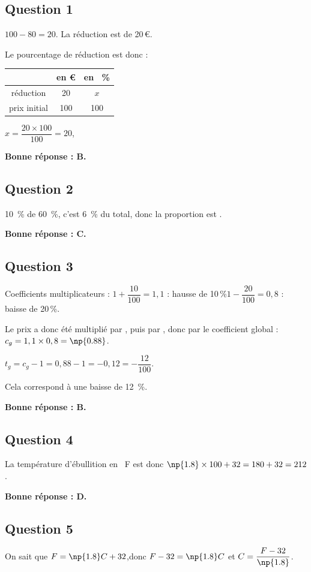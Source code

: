 \subsection*{Question 1}
	$100 - 80  =  20$.
	\quad
	La réduction est de 20\,\euro{}.

	Le pourcentage de réduction est donc :\quad
		\begin{tabular}{c|c|c}
	&en \euro  &en ~\% \\\hline
		réduction	& 20 &$x$  \\\hline
		prix initial&100&100\\
	\end{tabular}\qquad
	\mbox{$x = \dfrac{20\times100}{100} = 20$},

	\textbf{Bonne réponse : B.}

\subsection*{Question 2}
	10~\% de 60~\%, c'est 6~\% du total, donc la proportion est .

	\textbf{Bonne réponse : C.}

\subsection*{Question 3}
	Coefficients multiplicateurs : \quad $1 + \dfrac{10}{100}  =  1,1$ : hausse de 10\,\%\quad $1 - \dfrac{20}{100}  = 0,8$ : baisse de 20\,\%.

	Le prix a donc été multiplié par , puis par , donc par le coefficient global : \quad $c_g  =   1,1 \times 0,8  =  \np{0.88}$.

	$t_g  =  c_g - 1  =  0,88 - 1  =  -0,12  =  -\dfrac{12}{100}$.

	Cela correspond à une baisse de 12~\%.

	\textbf{Bonne réponse : B.}

\subsection*{Question 4}
	La température d'ébullition en ~\textdegree{}F est donc \quad  \mbox{$\np{1.8}\times100+32 = 180+32 = 212$}.

	\textbf{Bonne réponse : D.}

\subsection*{Question 5}
	On sait que \quad \mbox{$F = \np{1.8} C+32$},\quad  donc  \quad \mbox{$F-32 = \np{1.8} C$} \quad et \quad \mbox{$C = \dfrac{F-32}{\np{1.8}}$}.

